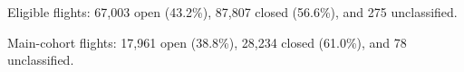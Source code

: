 Eligible flights: 67,003 open (43.2\%), 87,807 closed (56.6\%), and 275 unclassified.

Main-cohort flights: 17,961 open (38.8\%), 28,234 closed (61.0\%), and 78 unclassified.
